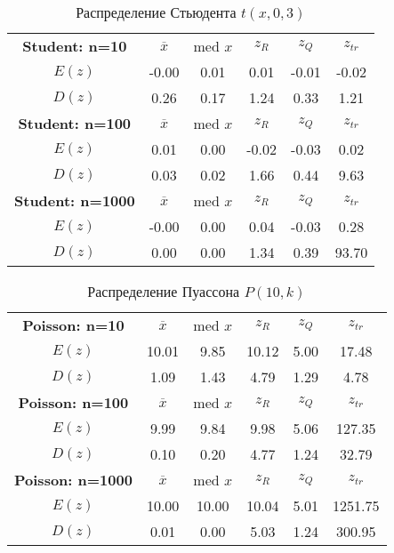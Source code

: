 \documentclass[14pt]{extarticle}
\begin{document}
\begin{table}[htbp]
    \centering
    \begin{tabular}{|c|c|c|c|c|c|}
        \toprule
        \textbf{Student: n=10} & \(\overline{x}\) & med \( x\) & \(z_R\) & \(z_Q\) & \(z_{tr}\)\\
        \(E(z)\) & -0.00 & 0.01 & 0.01 & -0.01 & -0.02   \\
        \(D(z)\) & 0.26 & 0.17 & 1.24 & 0.33 & 1.21 \\
        \midrule
  	\textbf{Student: n=100} & \(\overline{x}\) & med \( x\) & \(z_R\) & \(z_Q\) & \(z_{tr}\)\\
        \(E(z)\) & 0.01 & 0.00 & -0.02 & -0.03 & 0.02   \\
        \(D(z)\) & 0.03 & 0.02 & 1.66 & 0.44 & 9.63\\
        \midrule
	\textbf{Student: n=1000} & \(\overline{x}\) & med \( x\) & \(z_R\) & \(z_Q\) & \(z_{tr}\)\\
        \(E(z)\) & -0.00 & 0.00 & 0.04 & -0.03 & 0.28  \\
        \(D(z)\) & 0.00 & 0.00 & 1.34 & 0.39 & 93.70  \\
        \toprule
    \end{tabular}
    \caption{Распределение Стьюдента \(t(x, 0, 3)\)}
    \label{tab:student_t}
\end{table}

\begin{table}[htbp]
    \centering
    \begin{tabular}{|c|c|c|c|c|c|}
        \toprule
        \textbf{Poisson: n=10} & \(\overline{x}\) & med \(x\) & \(z_R\) & \(z_Q\) & \(z_{tr}\)\\
        \(E(z)\) & 10.01 & 9.85 & 10.12 & 5.00 & 17.48  \\
        \(D(z)\) & 1.09 & 1.43 & 4.79 & 1.29 & 4.78 \\
        \midrule
  	\textbf{Poisson: n=100} & \(\overline{x}\) & med \(x\) & \(z_R\) & \(z_Q\) & \(z_{tr}\)\\
        \(E(z)\) & 9.99 & 9.84 & 9.98 & 5.06 & 127.35     \\
        \(D(z)\) & 0.10 & 0.20 & 4.77 & 1.24 & 32.79 \\
        \midrule
	\textbf{Poisson: n=1000} & \(\overline{x}\) & med \(x\) & \(z_R\) & \(z_Q\) & \(z_{tr}\)\\
        \(E(z)\) & 10.00 & 10.00 & 10.04 & 5.01 & 1251.75 \\
        \(D(z)\) & 0.01 & 0.00 & 5.03 & 1.24 & 300.95 \\
        \toprule
    \end{tabular}
    \caption{Распределение Пуассона \(P(10, k)\)}
    \label{tab:poisson_t}
\end{table}
\end{document}
